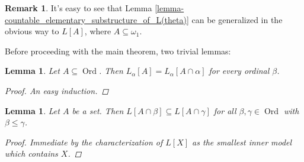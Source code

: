 \documentclass[11pt,a4paper]{report}
\newtheorem{lemma}[theorem]{Lemma}
\theoremstyle{definition}
\newtheorem*{remark}{Remark}
\theoremstyle{num.custom-title}
\theoremstyle{custom-title}
\DeclareMathOperator{\Ord}{\text{Ord}}
\DeclareMathOperator{\sse}{\subseteq}
\begin{document}
\begin{remark}
It's easy to see that Lemma \ref{lemma-countable_elementary_substructure_of_L(theta)} can be generalized in the obvious way to $L[A]$, where $A \sse \omega_1$.
\end{remark}

Before proceeding with the main theorem, two trivial lemmas:

\begin{lemma}\label{lemma-constructibility_relative_to_initial_segment}
Let $A \sse \Ord$. Then $L_\alpha[A] = L_\alpha [A \cap \alpha]$ for every ordinal $\beta$.
\begin{proof}
An easy induction.
\end{proof}
\end{lemma}

\begin{lemma}\label{lemma-constructibility_relative_to_different_sets}
Let $A$ be a set. 
Then $L[A \cap \beta] \sse L[A \cap \gamma]$ for all $\beta, \gamma \in \Ord$ with $\beta \leq \gamma$.
\begin{proof}
Immediate by the characterization of $L[X]$ as the smallest inner model which contains $X$.
\end{proof}
\end{lemma}
\end{document}
